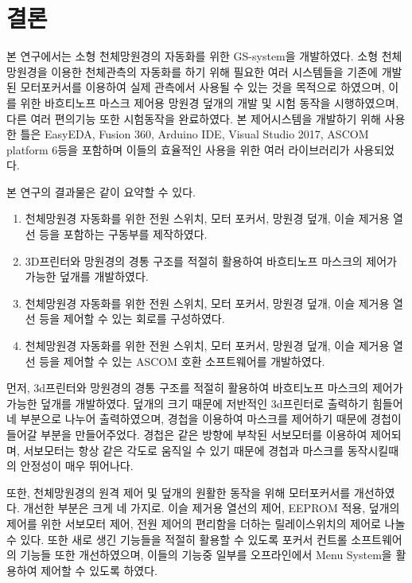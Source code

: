 \section{결론}
본 연구에서는 소형 천체망원경의 자동화를 위한 GS-system을 개발하였다. 
소형 천체망원경을 이용한 천체관측의 자동화를 하기 위해 필요한 여러 시스템들을 기존에 개발된 모터포커서를 이용하여 실제 관측에서 사용될 수 있는 것을 목적으로 하였으며, 이를 위한 바흐티노프 마스크 제어용 망원경 덮개의 개발 및 시험 동작을 시행하였으며, 다른 여러 편의기능 또한 시험동작을 완료하였다. 본 제어시스템을 개발하기 위해 사용한 틀은 EasyEDA, Fusion 360, Arduino IDE, Visual Studio 2017, ASCOM platform 6등을 포함하며 이들의 효율적인 사용을 위한 여러 라이브러리가 사용되었다.

본 연구의 결과물은 같이 요약할 수 있다. 

\begin{enumerate}
	
	\item 천체망원경 자동화를 위한 전원 스위치, 모터 포커서, 망원경 덮개, 이슬 제거용 열선 등을 포함하는 구동부를 제작하였다. 
	
		\item 3D프린터와 망원경의 경통 구조를 적절히 활용하여 바흐티노프 마스크의 제어가 가능한 덮개를 개발하였다.
	
	
	\item 천체망원경 자동화를 위한 전원 스위치, 모터 포커서, 망원경 덮개, 이슬 제거용 열선 등을 제어할 수 있는 회로를 구성하였다.
	
	\item 천체망원경 자동화를 위한 전원 스위치, 모터 포커서, 망원경 덮개, 이슬 제거용 열선 등을 제어할 수 있는 ASCOM 호환 소프트웨어를 개발하였다.
	
	
\end{enumerate}

먼저, 3d프린터와 망원경의 경통 구조를 적절히 활용하여 바흐티노프 마스크의 제어가 가능한 덮개를 개발하였다. 덮개의 크기 때문에 저반적인 3d프린터로 출력하기 힘들어 네 부분으로 나누어 출력하였으며, 경첩을 이용하여 마스크를 제어하기 때문에 경첩이 들어갈 부분을 만들어주었다. 경첩은 같은 방향에 부착된 서보모터를 이용하여 제어되며, 서보모터는 항상 같은 각도로 움직일 수 있기 때문에 경첩과 마스크를 동작시킬때의 안정성이 매우 뛰어나다.

또한, 천체망원경의 원격 제어 및 덮개의 원활한 동작을 위해 모터포커서를 개선하였다. 개선한 부분은 크게 네 가지로. 이슬 제거용 열선의 제어, EEPROM 적용, 덮개의 제어를 위한 서보모터 제어, 전원 제어의 편리함을 더하는 릴레이스위치의 제어로 나놀 수 있다. 또한 새로 생긴 기능들을 적절히 활용할 수 있도록 포커서 컨트롤 소프트웨어의 기능들 또한 개선하였으며, 이들의 기능중 일부를 오프라인에서 Menu System을 활용하여 제어할 수 있도록 하였다.

